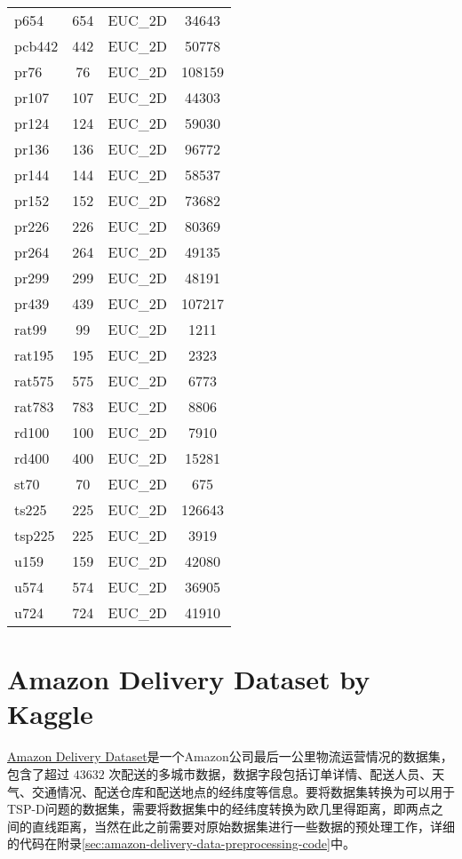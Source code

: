 \begin{tabularx}{\textwidth}{lccc}
    p654 & 654 & EUC\_2D & 34643 \\
    pcb442 & 442 & EUC\_2D & 50778 \\
    pr76 & 76 & EUC\_2D & 108159 \\
    pr107 & 107 & EUC\_2D & 44303 \\
    pr124 & 124 & EUC\_2D & 59030 \\
    pr136 & 136 & EUC\_2D & 96772 \\
    pr144 & 144 & EUC\_2D & 58537 \\
    pr152 & 152 & EUC\_2D & 73682 \\
    pr226 & 226 & EUC\_2D & 80369 \\
    pr264 & 264 & EUC\_2D & 49135 \\
    pr299 & 299 & EUC\_2D & 48191 \\
    pr439 & 439 & EUC\_2D & 107217 \\
    rat99 & 99 & EUC\_2D & 1211 \\
    rat195 & 195 & EUC\_2D & 2323 \\
    rat575 & 575 & EUC\_2D & 6773 \\
    rat783 & 783 & EUC\_2D & 8806 \\
    rd100 & 100 & EUC\_2D & 7910 \\
    rd400 & 400 & EUC\_2D & 15281 \\
    st70 & 70 & EUC\_2D & 675 \\
    ts225 & 225 & EUC\_2D & 126643 \\
    tsp225 & 225 & EUC\_2D & 3919 \\
    u159 & 159 & EUC\_2D & 42080 \\
    u574 & 574 & EUC\_2D & 36905 \\
    u724 & 724 & EUC\_2D & 41910 \\
\end{tabularx}

\section{Amazon Delivery Dataset by Kaggle}
\href{https://www.kaggle.com/datasets/sujalsuthar/amazon-delivery-dataset}{Amazon Delivery Dataset}是一个Amazon公司最后一公里物流运营情况的数据集，包含了超过 $43632$ 次配送的多城市数据，数据字段包括订单详情、配送人员、天气、交通情况、配送仓库和配送地点的经纬度等信息。要将数据集转换为可以用于TSP-D问题的数据集，需要将数据集中的经纬度转换为欧几里得距离，即两点之间的直线距离，当然在此之前需要对原始数据集进行一些数据的预处理工作，详细的代码在附录\ref{sec:amazon-delivery-data-preprocessing-code}中。

